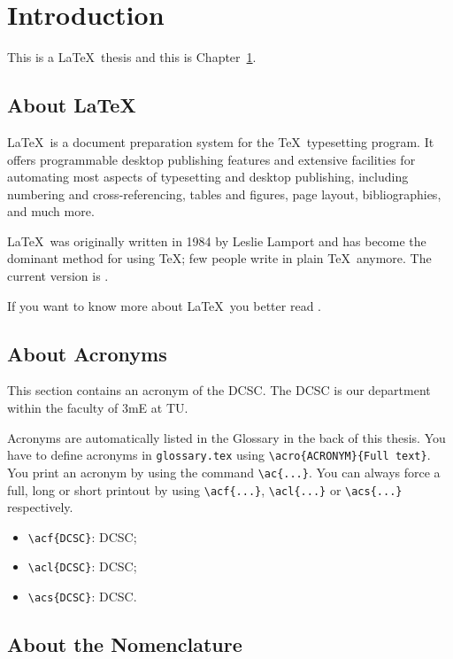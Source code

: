 %
\chapter{Introduction} \label{chap::intro}

This is a \LaTeX\ thesis and this is Chapter\ \ref{chap::intro}.

\section{About \texorpdfstring{\LaTeX}{LaTeX}}

\LaTeX\ is a document preparation system for the \TeX\ typesetting program. It offers programmable desktop publishing features and extensive facilities for automating most aspects of typesetting and desktop publishing, including numbering and cross-referencing, tables and figures, page layout, bibliographies, and much more.

\LaTeX\ was originally written in 1984 by Leslie Lamport and has become the dominant method for using \TeX; few people write in plain \TeX\ anymore. The current version is \LaTeXe.

If you want to know more about \LaTeX\ you better read \cite{texbook}.


\section{About Acronyms}

This section contains an acronym of the \ac{DCSC}. The \ac{DCSC} is our department within the faculty of \ac{3mE} at \ac{TU}. 

Acronyms are automatically listed in the Glossary in the back of this thesis. You have to define acronyms in \texttt{glossary.tex} using \verb"\acro{ACRONYM}{Full text}". You print an acronym by using the command \verb"\ac{...}". You can always force a full, long or short printout by using \verb"\acf{...}", \verb"\acl{...}" or \verb"\acs{...}" respectively.

\begin{itemize}
    \item \verb"\acf{DCSC}": \acf{DCSC};
    \item \verb"\acl{DCSC}": \acl{DCSC};
    \item \verb"\acs{DCSC}": \acs{DCSC}.
\end{itemize}

\section{About the Nomenclature}

